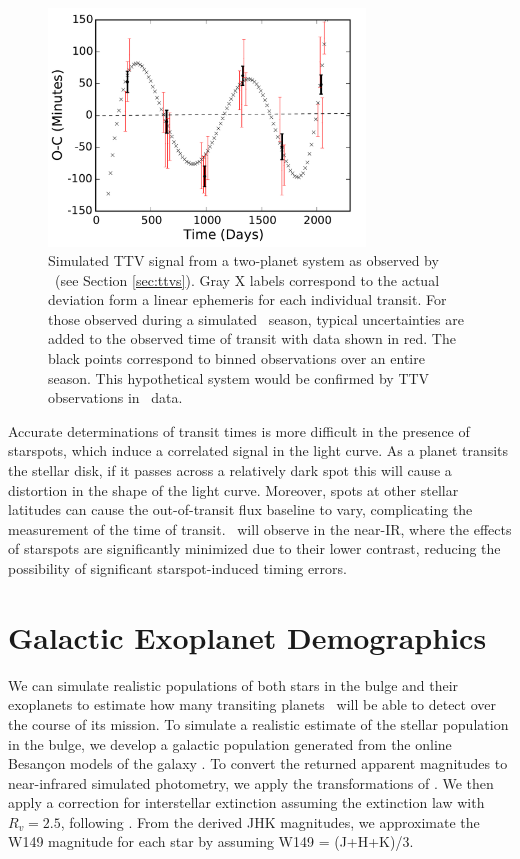 \begin{figure}[htbp!]
\centerline{\includegraphics[width=0.75\textwidth]{chapter8/f3a.pdf}}
\caption[Simulated TTV signal from an interacting two-planet system as observed by \WF.]{Simulated TTV signal from a two-planet system as observed by \WF\ (see Section \ref{sec:ttvs}). 
Gray X labels correspond to the actual deviation form a linear ephemeris for each 
individual transit. For those observed during a simulated \WF\ season, typical
uncertainties are added to the observed time of transit with data shown in red. The black
points correspond to binned observations over an entire season. This hypothetical system
would be confirmed by TTV observations in \WF\ data.}
\label{fig:ttv}
\end{figure}



Accurate determinations of transit times is more difficult in the presence of 
starspots, which induce a correlated signal in the light curve.
As a planet transits the stellar disk, if it passes across a 
relatively dark spot this will cause a distortion in the shape of the light curve.
Moreover, spots at other stellar latitudes can cause the out-of-transit flux baseline
to vary, complicating the measurement of the time of transit.
\WF\ will observe in the near-IR, where the effects of starspots are significantly 
minimized due to their lower contrast, reducing the possibility of significant 
starspot-induced timing errors.

\section{Galactic Exoplanet Demographics}
\label{ss:yield}


We can simulate realistic populations of both stars in the bulge and their exoplanets 
to estimate how many transiting planets \WF\ will be able to detect over the course of its mission.
To simulate a realistic estimate of the stellar population in the bulge, we develop a 
galactic population generated from the online Besan\c{c}on models of the galaxy \citep{Robin03}.
To convert the returned apparent magnitudes to near-infrared simulated photometry, we
apply the transformations of \citet{Bilir08}. 
We then apply a correction for interstellar extinction assuming the \citet{Cardelli89}
extinction law with $R_v = 2.5$, following \citet{Nataf13}.
From the derived JHK magnitudes, we approximate the W149 magnitude for each star
by assuming W149 = (J+H+K)/3.

